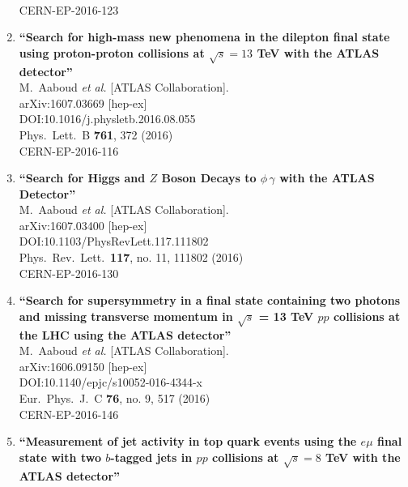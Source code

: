 \documentclass{article}
\begin{document}
\begin{enumerate}
  \\{}CERN-EP-2016-123
\item%
{\bf ``Search for high-mass new phenomena in the dilepton final state using proton-proton collisions at $\sqrt{s}=13$ TeV with the ATLAS detector''}
  \\{}M.~Aaboud {\it et al.} [ATLAS Collaboration].
  \\{}arXiv:1607.03669 [hep-ex]
  \\{}DOI:10.1016/j.physletb.2016.08.055
  \\{}Phys.\ Lett.\ B {\bf 761}, 372 (2016)
  \\{}CERN-EP-2016-116
\item%
{\bf ``Search for Higgs and $Z$ Boson Decays to $\phi\,\gamma$ with the ATLAS Detector''}
  \\{}M.~Aaboud {\it et al.} [ATLAS Collaboration].
  \\{}arXiv:1607.03400 [hep-ex]
  \\{}DOI:10.1103/PhysRevLett.117.111802
  \\{}Phys.\ Rev.\ Lett.\  {\bf 117}, no. 11, 111802 (2016)
  \\{}CERN-EP-2016-130
\item%
{\bf ``Search for supersymmetry in a final state containing two photons and missing transverse momentum in $\sqrt{s}$ = 13 TeV $pp$ collisions at the LHC using the ATLAS detector''}
  \\{}M.~Aaboud {\it et al.} [ATLAS Collaboration].
  \\{}arXiv:1606.09150 [hep-ex]
  \\{}DOI:10.1140/epjc/s10052-016-4344-x
  \\{}Eur.\ Phys.\ J.\ C {\bf 76}, no. 9, 517 (2016)
  \\{}CERN-EP-2016-146
\item%
{\bf ``Measurement of jet activity in top quark events using the $e\mu$ final state with two $b$-tagged jets in $pp$ collisions at $\sqrt{s}=8$ TeV with the ATLAS detector''}

\end{enumerate}
\end{document}
